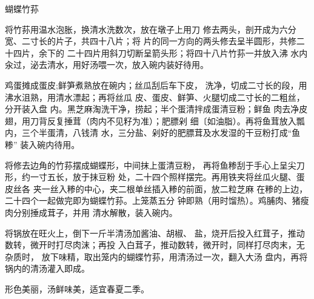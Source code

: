 \begin{recipe}{蝴蝶竹荪}

\ingredients



\cooking

\step 将竹荪用温水泡胀，换清水洗数次，放在墩子上用刀 修去两头，剖开成为六分宽、二寸长的片子，共四十八片；将 片的同一方向的两头修去呈半圆形，共修二十四片，余下的 二十四片用斜刀切断呈箭头形；将四十八片竹荪一并放入沸 水内汆过，泌去清水，用好汤喂一次，放入碗内装好待用。

\step 鸡蛋摊成蛋皮;鲜笋煮熟放在碗内；丝瓜刮后车下皮， 洗净，切成二寸长的段，用沸水沮熟，用清水漂起；再将丝瓜 皮、蛋皮、鲜笋、火腿切成二寸长的二粗丝，分开装入盘 内。黑芝麻淘洗干净，捞起；半个蛋清拌成蛋清豆粉；鲜鱼 肉去净皮翅，用刀背反复捶茸（肉内不见籽为准）；肥膘剁 细〔如油脂）。再将鱼茸放入瓢内，三个半蛋清，八钱清 水，三分盐、剁好的肥膘茸及水发湿的干豆粉打成“鱼糁” 装入碗内待用。

\step 将修去边角的竹荪摆成蝴蝶形，中间抹上蛋清豆粉， 再将鱼糁刮于手心上呈尖刀形，约一寸五长，放于抹豆粉 处，二十四个照样摆完。再用铁夹将丝瓜火腿、蛋皮丝各 夹一丝入糁的中心，夹二根单丝插入糁的前面，放二粒芝麻 在糁的上边，二十四个一起做完即为蝴蝶竹荪。上笼蒸五分 钟即熟（用时馏热）。鸡脯肉、猪瘦肉分别捶成茸子，并用 清水解散，装入碗内。

\step 将锅放在旺火上，倒下一斤半清汤加酱油、胡椒、 盐，烧开后投入红茸子，推动数转，微开时打尽肉沫；再投 入白茸子，推动数转，微开时，同样打尽肉末，无杂质时， 放下味精，取出笼内的蝴蝶竹荪，用清汤过一次，翻入大汤 盘内，再将锅内的清汤灌入即成。

\notes

形色美丽，汤鲜味美，适宜春夏二季。

\end{recipe}

